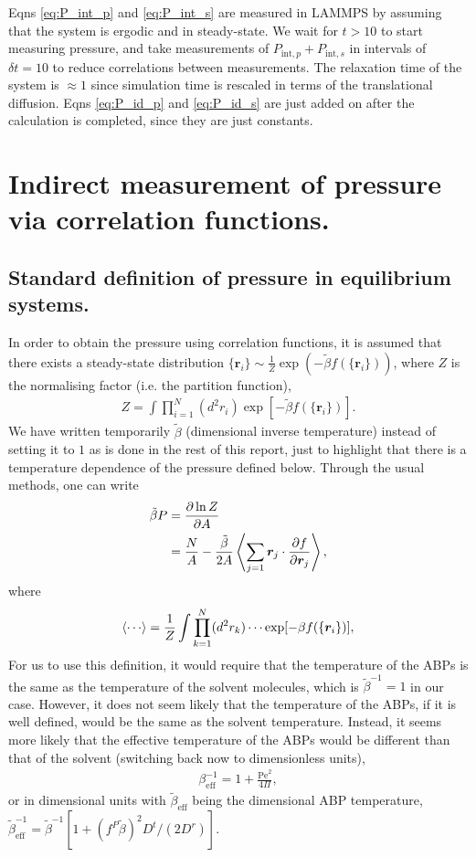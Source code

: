 \documentclass[twocolumn,amsmath,amssymb,aps]{revtex4-1}%
\begin{document}
Eqns \ref{eq:P_int_p} and \ref{eq:P_int_s} are measured in
LAMMPS by assuming that the system is ergodic and in steady-state.
We wait for $t > 10$ to start measuring pressure, and take
measurements of $P_{\mathrm{int},p} + P_{\mathrm{int},s}$
in intervals of $\delta t = 10$ to reduce correlations between
measurements. The relaxation time of the system is $\approx 1$
since simulation time is rescaled in terms of the translational
diffusion. Eqns \ref{eq:P_id_p} and \ref{eq:P_id_s} are just
added on after the calculation is completed, since they are
just constants.

\section{Indirect measurement of pressure via correlation functions.}

\subsection{Standard definition of pressure in equilibrium systems.
  \label{sub:eq}}
In order to obtain the pressure using correlation functions, it is
assumed that there exists a steady-state distribution
$\{\bm{r}_i\}\sim \frac{1}{Z}\exp(-\tilde{\beta} f(\{\bm{r}_i\}))$,
where $Z$ is the normalising factor (i.e. the partition function),
\begin{align}\label{eq:Zstandard}
  Z = \int\prod_{i=1}^N(d^2r_i)\exp[-\tilde{\beta} f(\{\bm{r}_i\})].
\end{align}
We have written temporarily $\tilde{\beta}$ (dimensional inverse
temperature) instead of setting it to $1$ as is done in the rest of
this report, just to highlight that there is a temperature dependence
of the pressure defined below.
Through the usual methods, one can write
\begin{align}\label{eq:betaP}
  \tilde{\beta} P
  &= \frac{\partial \ln Z}{\partial A}\nonumber\\
  &= \frac{N}{A}
  -\frac{\tilde{\beta}}{2A}\Braket{\sum_{j=1}\bm{r}_j\cdot
  \frac{\partial f}{\partial\bm{r}_j}},
\end{align}
where
\begin{align}
  \Braket{\cdots} = \frac{1}{Z}
  \int\prod_{k=1}^N(d^2r_k)
  \cdots\exp[-\beta f(\{\bm{r}_i\})],
\end{align}
For us to use this definition, it would require that the
temperature of the ABPs is
the same as the temperature of the solvent molecules, which is
$\tilde{\beta}^{-1}=1$ in our case.
However, it does not seem likely that the temperature of the
ABPs, if it is well defined, would be the same as the solvent
temperature. Instead, it seems more likely that the effective
temperature of the ABPs would be different than that of the solvent
(switching back now to dimensionless units),
\begin{align}
  \beta_{\mathrm{eff}}^{-1}
  = 1 + \frac{\mathrm{Pe}^2}{4\Pi},
\end{align}
or in dimensional units with  $\tilde{\beta}_{\mathrm{eff}}$ being
the dimensional ABP temperature,
$\tilde{\beta}_{\mathrm{eff}}^{-1}
=\tilde{\beta}^{-1}[1+(f^P\tilde{\beta})^2D^t/(2D^r)]$.
\end{document}
